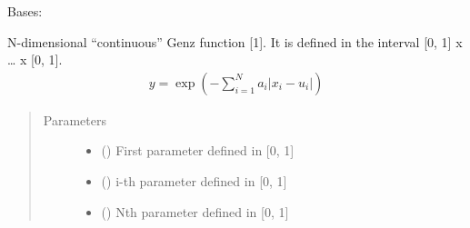 \documentclass[letterpaper,10pt,english,openany,oneside]{sphinxmanual}
\begin{document}
\begin{fulllineitems}
\label{\detokenize{pygpc.testfunctions:pygpc.testfunctions.testfunctions.GenzContinuous}}
Bases: {\hyperref[\detokenize{pygpc:pygpc.AbstractModel.AbstractModel}]{}}

N-dimensional “continuous” Genz function {[}1{]}. It is defined in the interval {[}0, 1{]} x … x {[}0, 1{]}.
\begin{equation*}
\begin{split}y = \exp{\left(- \sum_{i=1}^{N} a_i | x_i - u_i | \right)}\end{split}
\end{equation*}\begin{quote}\begin{description}
\item[{Parameters}] \leavevmode\begin{itemize}
\item {} 
\sphinxstyleliteralstrong{\sphinxupquote{{[}}}\sphinxstyleliteralstrong{\sphinxupquote{{]}}} (\sphinxstyleliteralemphasis{\sphinxupquote{ {[}}}\sphinxstyleliteralemphasis{\sphinxupquote{{]}}}) \textendash{} First parameter defined in {[}0, 1{]}

\item {} 
\sphinxstyleliteralstrong{\sphinxupquote{{[}}}\sphinxstyleliteralstrong{\sphinxupquote{{]}}} (\sphinxstyleliteralemphasis{\sphinxupquote{ {[}}}\sphinxstyleliteralemphasis{\sphinxupquote{{]}}}) \textendash{} i-th parameter defined in {[}0, 1{]}

\item {} 
\sphinxstyleliteralstrong{\sphinxupquote{{[}}}\sphinxstyleliteralstrong{\sphinxupquote{{]}}} (\sphinxstyleliteralemphasis{\sphinxupquote{ {[}}}\sphinxstyleliteralemphasis{\sphinxupquote{{]}}}) \textendash{} Nth parameter defined in {[}0, 1{]}


\end{itemize}
\end{description}
\end{quote}
\end{fulllineitems}
\end{document}
